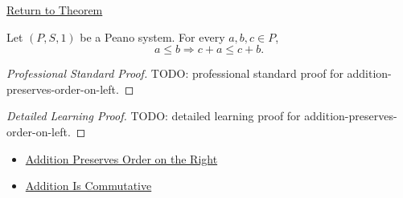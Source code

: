 \newpage
{}
\label{prf:addition-preserves-order-on-left}

\begin{remark*}[Return]
\hyperref[thm:addition-preserves-order-on-left]{Return to Theorem}
\end{remark*}

\begin{theorem*}
Let $(P,S,1)$ be a Peano system. For every $a,b,c \in P$,
\[
a \le b
\Longrightarrow
c+a \le c+b.
\]
\end{theorem*}

\begin{proof}[Professional Standard Proof]
\LRAProofBodyStart
TODO: professional standard proof for addition-preserves-order-on-left.
\end{proof}

\begin{proof}[Detailed Learning Proof]
\LRAProofBodyStart
TODO: detailed learning proof for addition-preserves-order-on-left.
\end{proof}

\begin{remark*}
\end{remark*}

\begin{dependencies}
\begin{itemize}
  \item \hyperref[thm:addition-preserves-order-on-right]{Addition Preserves Order on the Right}
  \item \hyperref[thm:addition-commutative]{Addition Is Commutative}
\end{itemize}
\end{dependencies}

\clearpage
